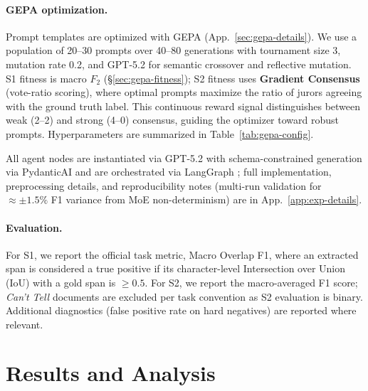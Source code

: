 \documentclass[11pt]{article}
\begin{document}
\paragraph{GEPA optimization.} Prompt templates are optimized with GEPA \cite{agrawal2025gepa}
(App.~\ref{sec:gepa-details}). We use a population of 20--30 prompts over
40--80 generations with tournament size 3, mutation rate 0.2, and GPT-5.2 for
semantic crossover and reflective mutation. S1 fitness is macro $F_2$
(\S\ref{sec:gepa-fitness}); S2 fitness uses \textbf{Gradient Consensus}
(vote-ratio scoring), where optimal prompts maximize the ratio of jurors
agreeing with the ground truth label. This continuous reward signal
distinguishes between weak (2--2) and strong (4--0) consensus, guiding the
optimizer toward robust prompts. Hyperparameters are summarized in
Table~\ref{tab:gepa-config}.

All agent nodes are instantiated via GPT-5.2 with schema-constrained generation via PydanticAI
\cite{pydanticai2024} and are orchestrated via LangGraph \cite{langgraph2024};
full implementation, preprocessing details, and reproducibility notes (multi-run validation for $\approx \pm 1.5\%$ F1 variance from MoE non-determinism) are in
App.~\ref{app:exp-details}.

\paragraph{Evaluation.}
For S1, we report the official task metric, Macro Overlap F1, where an extracted span is considered a true positive if its character-level Intersection over Union (IoU) with a gold span is $\ge 0.5$. For S2, we report the macro-averaged F1 score; \textit{Can't Tell} documents are excluded per task convention as S2 evaluation is binary. Additional diagnostics (false positive rate on hard negatives) are reported where relevant.


\section{Results and Analysis}
\end{document}
